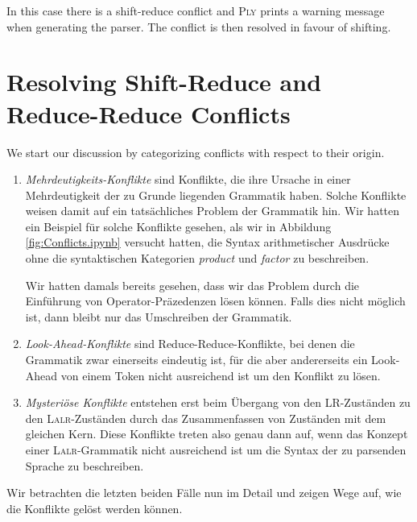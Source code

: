 \begin{enumerate}
\begin{enumerate}[(a)]
            In this case there is a shift-reduce conflict and \textsc{Ply} prints a warning message when
            generating the parser.  The conflict is then resolved in favour of shifting.
      \end{enumerate}
\end{enumerate}


\section{Resolving Shift-Reduce and Reduce-Reduce Conflicts}
We start our discussion by categorizing conflicts with respect to their origin.
\begin{enumerate}
\item \emph{Mehrdeutigkeits-Konflikte} sind Konflikte, die ihre Ursache in einer Mehrdeutigkeit
      der zu Grunde liegenden Grammatik haben.  Solche Konflikte weisen damit auf ein tats\"achliches
      Problem der Grammatik hin.  Wir hatten ein Beispiel f\"ur solche Konflikte gesehen, als wir in
      Abbildung \ref{fig:Conflicts.ipynb} 
      versucht hatten, die Syntax arithmetischer Ausdr\"ucke ohne die syntaktischen
      Kategorien \textsl{product} und \textsl{factor} zu beschreiben.

      Wir hatten damals bereits gesehen, dass wir das Problem durch die Einf\"uhrung von
      Operator-Pr\"azedenzen l\"osen k\"onnen.  Falls dies nicht m\"oglich ist, dann bleibt nur das
      Umschreiben der Grammatik.
\item \emph{Look-Ahead-Konflikte} sind Reduce-Reduce-Konflikte, bei denen die Grammatik zwar
      einerseits eindeutig ist, f\"ur die aber andererseits
      ein Look-Ahead von einem Token nicht ausreichend ist um den Konflikt zu l\"osen.
\item \emph{Mysteri\"ose Konflikte} entstehen erst beim \"Ubergang von den LR-Zust\"anden zu den \textsc{Lalr}-Zust\"anden 
      durch das Zusammenfassen von Zust\"anden mit dem gleichen Kern.  Diese Konflikte treten also
      genau dann auf, wenn das Konzept einer \textsc{Lalr}-Grammatik nicht ausreichend ist um die Syntax der
      zu parsenden Sprache zu beschreiben.
\end{enumerate}
Wir betrachten die letzten beiden F\"alle nun im Detail und zeigen Wege auf, wie die Konflikte gel\"ost
werden k\"onnen.

